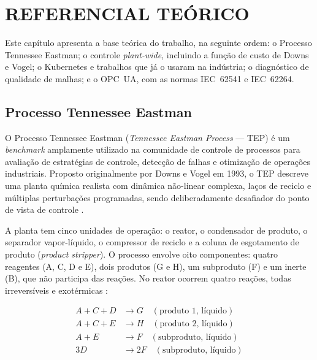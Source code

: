 \chapter[REFERENCIAL TEÓRICO]{REFERENCIAL TEÓRICO}
\label{cha:referencial}

Este capítulo apresenta a base teórica do trabalho, na seguinte ordem: o Processo Tennessee Eastman; o controle \textit{plant-wide}, incluindo a função de custo de Downs e Vogel; o Kubernetes e trabalhos que já o usaram na indústria; o diagnóstico de qualidade de malhas; e o OPC~UA, com as normas IEC~62541 e IEC~62264.

\section{Processo Tennessee Eastman}
\label{sec:tep}

O Processo Tennessee Eastman (\textit{Tennessee Eastman Process} — TEP) é um \textit{benchmark} amplamente utilizado na comunidade de controle de processos para avaliação de estratégias de controle, detecção de falhas e otimização de operações industriais. Proposto originalmente por Downs e Vogel em 1993, o TEP descreve uma planta química realista com dinâmica não-linear complexa, laços de reciclo e múltiplas perturbações programadas, sendo deliberadamente desafiador do ponto de vista de controle \cite{DOWNS1993}.

A planta tem cinco unidades de operação: o reator, o condensador de produto, o separador vapor-líquido, o compressor de reciclo e a coluna de esgotamento de produto (\textit{product stripper}). O processo envolve oito componentes: quatro reagentes (A, C, D e E), dois produtos (G e H), um subproduto (F) e um inerte (B), que não participa das reações. No reator ocorrem quatro reações, todas irreversíveis e exotérmicas \cite{DOWNS1993}:

\begin{align}
	A + C + D & \rightarrow G \quad (\text{produto 1, líquido}) \label{eq:rx1}   \\
	A + C + E & \rightarrow H \quad (\text{produto 2, líquido}) \label{eq:rx2}   \\
	A + E     & \rightarrow F \quad (\text{subproduto, líquido}) \label{eq:rx3}  \\
	3D        & \rightarrow 2F \quad (\text{subproduto, líquido}) \label{eq:rx4}
\end{align}

